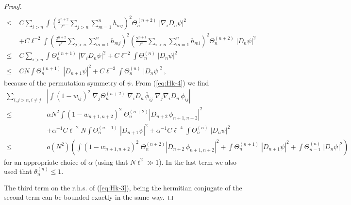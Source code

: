 \documentclass[11pt]{article}
\newcommand{\eps}{\varepsilon}
\renewcommand{\a}{\alpha}
\begin{document}
\begin{proof}
\begin{equation}
\begin{split}
\\ \leq \; & C\sum_{i>n} \int \left( \frac{2^{n+2}}{\ell^{\eps}}
\sum_{j >n} \sum_{m=1}^n h_{mj} \right)^2 \Theta^{(n+2)}_n \;
|\nabla_i D_n \psi|^2 \\ &+ C\ell^{-2} \int \left(
\frac{2^{n+2}}{\ell^{\eps}} \sum_{j >n} \sum_{m=1}^n h_{mj}
\right)^2 \left( \frac{2^{n+1}}{\ell^{\eps}} \sum_{i >n}
\sum_{m=1}^n h_{mi} \right)^2 \Theta_n^{(n+2)} \; |D_n \psi|^2
\\ \leq \; & C\sum_{i>n} \int \Theta^{(n+1)}_{n} \; |\nabla_i
D_n \psi|^2 + C \ell^{-2} \int \Theta_n^{(n)} \; |D_n \psi|^2
\\ \leq \; &C N \int \Theta^{(n+1)}_{n} \; |
D_{n+1} \psi|^2 + C \ell^{-2} \int \Theta_n^{(n)} \; |D_n \psi|^2 \,
,
\end{split}
\end{equation}
because of the permutation symmetry of $\psi$. {F}rom
(\ref{eq:Hk-4}) we find
\begin{equation}\label{eq:Hk-6}
\begin{split}
\sum_{i,j > n, i\neq j} &\left| \int (1-w_{ij})^2 \; \nabla_j
\Theta^{(n+2)}_n \; \nabla_i D_n \,\overline{\phi}_{ij} \;
\nabla_j \nabla_i D_n \, \phi_{ij}\right| \\ \leq \; &\a N^2 \int
(1-w_{n+1,n+2})^2 \; \Theta^{(n+2)}_n |D_{n+2} \, \phi_{n+1,n+2}|^2
\\ &+\a^{-1} C \ell^{-2} N \int \Theta^{(n+1)}_n \; | D_{n+1} \psi|^2 +
\a^{-1} C \ell^{-4} \int \Theta_n^{(n)} \; |D_n
\psi|^2 \, \\
\leq \; & o(N^2) \left( \int (1-w_{n+1,n+2})^2 \; \Theta^{(n+2)}_n
|D_{n+2} \, \phi_{n+1,n+2}|^2 +  \int \Theta^{(n+1)}_n \; | D_{n+1}
\psi|^2 + \int \Theta_{n-1}^{(n)} \; |D_n \psi|^2 \right)
\end{split}
\end{equation}
for an appropriate choice of $\a$ (using that $N\ell^2 \gg 1$). In
the last term we also used that $\theta_n^{(n)} \leq 1$.

\medskip

The third term on the r.h.s. of (\ref{eq:Hk-3}), being the hermitian
conjugate of the second term can be bounded exactly in the same way.

\medskip



\end{proof}
\end{document}
